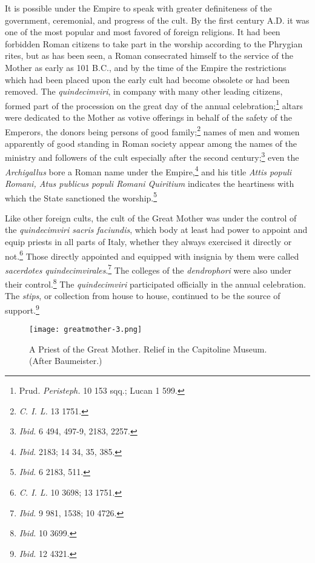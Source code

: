 \documentclass[a4paper, 11pt, oneside, polutonikogreek, english]{article}
\begin{document}
It is possible under the Empire to speak with greater definiteness of the government, ceremonial, and progress of the cult. By the first century \textsc{A.D.} it was one of the most popular and most favored of foreign religions. It had been forbidden Roman citizens to take part in the worship according to the Phrygian rites, but as has been seen, a Roman consecrated himself to the service of the Mother as early as 101 \textsc{B.C.}, and by the time of the Empire the restrictions which had been placed upon the early cult had become obsolete or had been removed. The \emph{quindecimviri}, in company with many other leading citizens, formed part of the procession on the great day of the annual celebration;\footnote{Prud. \emph{Peristeph.} 10 153 sqq.; Lucan 1 599.} altars were dedicated to the Mother as votive offerings in behalf of the safety of the Emperors, the donors being persons of good family;\footnote{\emph{C. I. L.} 13 1751.} names of men and women apparently of good standing in Roman society appear among the names of the ministry and followers of the cult especially after the second century;\footnote{\emph{Ibid.} 6 494, 497-9, 2183, 2257.} even the \emph{Archigallus} bore a Roman name under the Empire,\footnote{\emph{Ibid.} 2183; 14 34, 35, 385.} and his title \emph{Attis populi Romani, Atus publicus populi Romani Quiritium} indicates the heartiness with which the State sanctioned the worship.\footnote{\emph{Ibid.} 6 2183, 511.}

Like other foreign cults, the cult of the Great Mother was under the control of the \emph{quindecimviri sacris faciundis}, which body at least had power to appoint and equip priests in all parts of Italy, whether they always exercised it directly or not.\footnote{\emph{C. I. L.} 10 3698; 13 1751.} Those directly appointed and equipped with insignia by them were called \emph{sacerdotes quindecimvirales}.\footnote{\emph{Ibid.} 9 981, 1538; 10 4726.} The colleges of the \emph{dendrophori} were also under their control.\footnote{\emph{Ibid.} 10 3699.} The \emph{quindecimviri} participated officially in the annual celebration. The \emph{stips}, or collection from house to house, continued to be the source of support.\footnote{\emph{Ibid.} 12 4321.}

\begin{figure}[H]
\centering
\texttt{[image: greatmother-3.png]}
\caption{A Priest of the Great Mother. Relief in the Capitoline Museum. (After Baumeister.)}
\end{figure}
\end{document}

